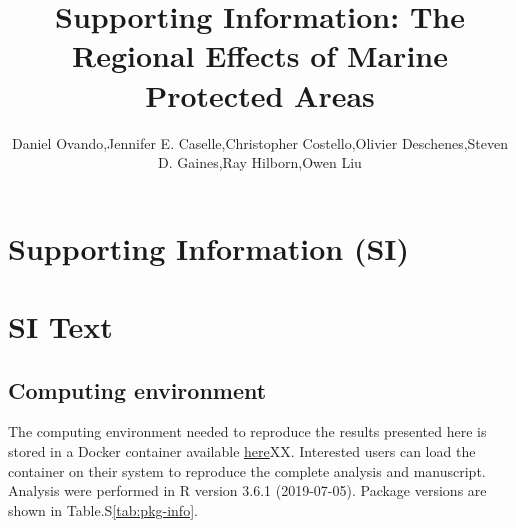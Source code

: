 \documentclass[]{article}
\title{Supporting Information: The Regional Effects of Marine Protected Areas}
\author{Daniel Ovando,Jennifer E. Caselle,Christopher Costello,Olivier Deschenes,Steven D. Gaines,Ray Hilborn,Owen Liu}
\date{}
\begin{document}
\maketitle

{
\setcounter{tocdepth}{2}
\tableofcontents
}
\hypertarget{supporting-information-si}{%
\section{Supporting Information (SI)}\label{supporting-information-si}}

\hypertarget{si-text}{%
\section*{SI Text}\label{si-text}}

\hypertarget{computing-environment}{%
\subsection{Computing environment}\label{computing-environment}}

The computing environment needed to reproduce the results presented here is stored in a Docker container available \href{}{here}XX. Interested users can load the container on their system to reproduce the complete analysis and manuscript. Analysis were performed in R version 3.6.1 (2019-07-05). Package versions are shown in Table.S\ref{tab:pkg-info}.
\end{document}
